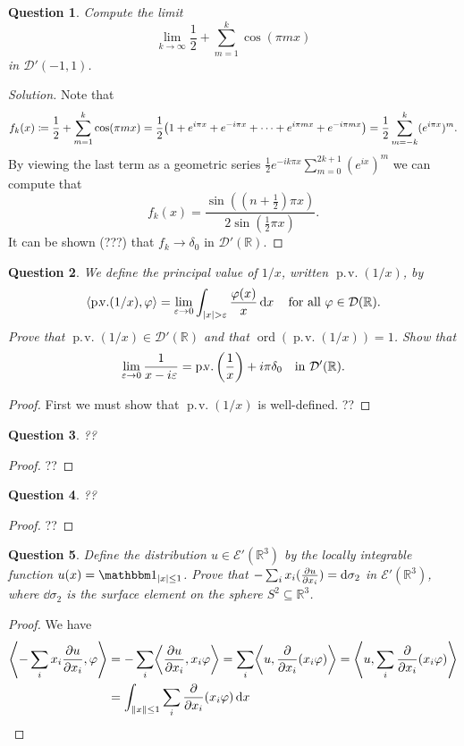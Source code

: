 \documentclass{article}
\theoremstyle{plain}
\newtheorem{question}{Question}
\theoremstyle{remark}
\newenvironment{solution}{\begin{proof}[Solution]\renewcommand\qedsymbol{}}{\end{proof}}
\renewcommand{\epsilon}{\varepsilon}
\renewcommand{\phi}{\varphi}
\newcommand{\Bb}{\mathbb}
\newcommand{\Cal}{\mathcal}
\newcommand{\RR}{\Bb R}
\newcommand{\EE}{\Cal E}
\newcommand{\DD}{\Cal D}
\DeclarePairedDelimiter{\ang}{\langle}{\rangle}
\newcommand\ceq\coloneqq %
\newcommand\eps\epsilon
\newcommand\ind{\mathbbm 1} %
\DeclareMathOperator{\ord}{ord}
\DeclareMathOperator{\prv}{p.\!v.}
\begin{document}
\begin{question}
	Compute the limit
	\[
	\lim_{k\to\infty} \frac12 + \sum_{m=1}^k \cos(\pi m x)
	\]
	in $\DD'(-1, 1)$. 
\end{question}

\begin{solution}
	Note that \[
	f_k(x) \ceq 
	\frac12 + \sum_{m=1}^k \cos(\pi m x) = \frac12\qty(1 + e^{i \pi x} + e^{-i\pi x} + \dotsb + e^{i \pi m x} + e^{-i\pi m x}) = \frac12 \sum_{m=-k}^k (e^{i\pi x})^m.
	\]
	By viewing the last term as a geometric series $\frac12 e^{-ik\pi x} \sum_{m=0}^{2k+1} (e^{ix})^m$ we can compute that 
	\[
	f_k(x) = \frac{\sin((n + \frac12) \pi x)}{2\sin(\frac12\pi x)}. 
	\]
	It can be shown (???) that $f_k \to \delta_0$ in $\DD'(\RR)$. 
\end{solution}

\begin{question}
	We define the \emph{principal value} of $1/x$, written $\prv(1/x)$, by
	\[
	\ang*{\prv(1/x), \phi} = \lim_{\eps \to 0} \int_{\abs{x} > \eps} \frac{\phi(x)}{x} \dd{x} \quad\text{for all $\phi \in \DD(\RR)$}. 
	\]
	Prove that $\prv(1/x) \in \DD'(\RR)$ and that $\ord(\prv(1/x)) = 1$. Show that
	\[
	\lim_{\eps \to 0} \frac{1}{x - i\eps} = \prv\qty(\frac1x) + i\pi \delta_0 \quad\text{in $\DD'(\RR)$}. 
	\]
\end{question}

\begin{proof}
	First we must show that $\prv(1/x)$ is well-defined.  ??
\end{proof}

\begin{question}
	??
\end{question}
\begin{proof}
	??
\end{proof}

\begin{question}
	??
\end{question}

\begin{proof}
	??
\end{proof}

\begin{question}
	Define the distribution $u \in \EE'(\RR^3)$ by the locally integrable function $u(x) = \ind_{\abs{x}\leq 1}$. Prove that $-\sum_i x_i (\pdv{u}{x_i}) = \dd{\sigma_2}$ in $\EE'(\RR^3)$, where $\dd{\sigma_2}$ is the surface element on the sphere $S^2 \subseteq \RR^3$. 
\end{question}

\begin{proof}
	We have
	\begin{align*}
		\ang*{- \sum_i x_i \pdv{u}{x_i}, \phi} &= - \sum_i \ang*{\pdv{u}{x_i}, x_i\phi} = \sum_i \ang*{u, \pdv{x_i}(x_i \phi)} = \ang*{u, \sum_i \pdv{x_i}(x_i\phi)} \\
		&= \int_{\norm{x} \leq 1} \sum_i \pdv{x_i}(x_i\phi) \dd{x}
	\end{align*}
\end{proof}
\end{document}

